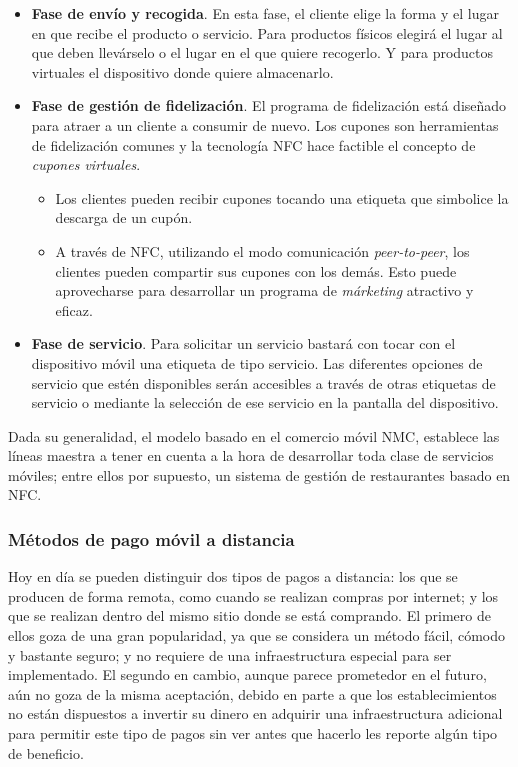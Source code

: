 \begin{itemize}
\begin{itemize}
    \end{itemize}
  \item \textbf{Fase de envío y recogida}. En esta fase, el cliente elige
  la forma y el lugar en que recibe el producto o servicio. Para productos
  físicos elegirá el lugar al que deben llevárselo o el lugar en el que quiere
  recogerlo. Y para productos virtuales el dispositivo donde quiere
  almacenarlo.
  \item \textbf{Fase de gestión de fidelización}. El programa de fidelización
  está diseñado para atraer a un cliente a consumir de nuevo. Los cupones son
  herramientas de fidelización comunes y la tecnología \acs{NFC} hace factible
  el concepto de \emph{cupones virtuales}.
    \begin{itemize}
    \item Los clientes pueden recibir cupones tocando una etiqueta que 
    simbolice la descarga de un cupón.
    \item A través de \acs{NFC}, utilizando el modo comunicación
    \emph{peer-to-peer}, los clientes pueden compartir sus cupones con los
    demás. Esto puede aprovecharse para desarrollar un programa de
    \emph{márketing} atractivo y eficaz.
    \end{itemize}
  \item \textbf{Fase de servicio}. Para solicitar un servicio bastará con
  tocar con el dispositivo móvil una etiqueta de tipo servicio. Las diferentes
  opciones de servicio que estén disponibles serán accesibles a través de
  otras etiquetas de servicio o mediante la selección de ese servicio en la
  pantalla del dispositivo.
  \end{itemize}
  
  Dada su generalidad, el modelo basado en el comercio móvil \acs{NMC},
  establece las líneas maestra a tener en cuenta a la hora de desarrollar
  toda clase de servicios móviles; entre ellos por supuesto, un sistema de 
  gestión de restaurantes basado en \acs{NFC}.

    \subsubsection{Métodos de pago móvil a distancia}
  Hoy en día se pueden distinguir dos tipos de pagos a distancia: los que se
  producen de forma remota, como cuando se realizan compras por internet;
  y los que se realizan dentro del mismo sitio donde se está
  comprando. El primero de ellos goza de una gran popularidad, ya que se
  considera un método fácil, cómodo y bastante seguro; y no requiere de una
  infraestructura especial para ser implementado. El segundo en cambio,
  aunque parece prometedor en el futuro, aún no goza de la misma aceptación, 
  debido en parte a que los establecimientos no están dispuestos a 
  invertir su dinero en adquirir una infraestructura adicional para permitir 
  este tipo de pagos sin ver antes que hacerlo les reporte algún tipo de 
  beneficio.

